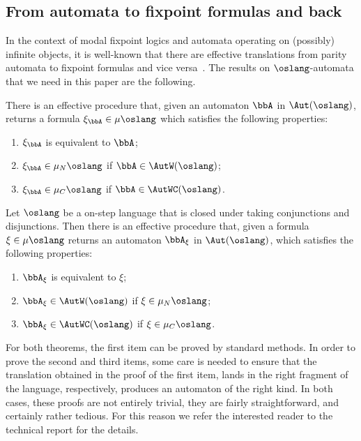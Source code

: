 \subsection{From automata to fixpoint formulas and back}
   \label{sec:parity-to-mc}

In the context of modal fixpoint logics and automata operating on (possibly)
infinite objects, it is well-known that there are effective translations from 
parity automata to fixpoint formulas and vice versa~\cite{ALG02}.
The results on $\oslang$-automata that we need in this paper are the 
following.

\begin{theorem}\label{t:autofor}
There is an effective procedure that, given an automaton $\bbA$ in 
$\Aut(\oslang)$, returns a formula $\xi_{\bbA} \in \mu\oslang$ which satisfies
the following properties:
\begin{enumerate}[(1)]
    
\item $\xi_{\bbA}$ is equivalent to $\bbA$;

\item $\xi_{\bbA} \in \mu_{N}\oslang$ if $\bbA \in \AutW(\oslang)$;

\item $\xi_{\bbA} \in \mu_{C}\oslang$ if $\bbA \in \AutWC(\oslang)$.
\end{enumerate}
\end{theorem}

\begin{theorem}\label{t:fortoaut}
Let $\oslang$ be a on-step language that is closed under taking conjunctions and 
disjunctions.
Then there is an effective procedure that, given a formula $\xi \in \mu\oslang$
returns an automaton $\bbA_{\xi}$ in $\Aut(\oslang)$, which satisfies the 
following properties:
\begin{enumerate}[(1)]
\item $\bbA_\xi$ is equivalent to $\xi$;
\item  $\bbA_\xi \in \AutW(\oslang)$ if $\xi \in \mu_{N}\oslang$;
\item  $\bbA_\xi \in \AutWC(\oslang)$ if $\xi \in \mu_{C}\oslang$.
\end{enumerate}
\end{theorem}

For both theorems, the first item can be proved by standard methods. 
In order to prove the second and third items, some care is needed to ensure that
the translation obtained in the proof of the first item, lands in the right 
fragment of the language, respectively, produces an automaton of the right kind.
In both cases, these proofs are not entirely trivial, they are fairly 
straightforward, and certainly rather tedious. 
For this reason we refer the interested reader to the technical report for the
details.